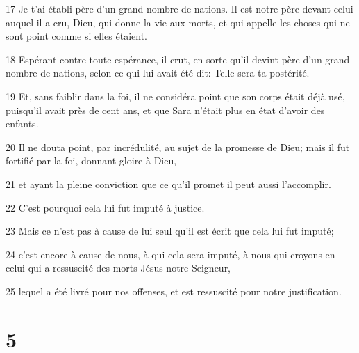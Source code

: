 \par 17 Je t'ai établi père d'un grand nombre de nations. Il est notre père devant celui auquel il a cru, Dieu, qui donne la vie aux morts, et qui appelle les choses qui ne sont point comme si elles étaient.
\par 18 Espérant contre toute espérance, il crut, en sorte qu'il devint père d'un grand nombre de nations, selon ce qui lui avait été dit: Telle sera ta postérité.
\par 19 Et, sans faiblir dans la foi, il ne considéra point que son corps était déjà usé, puisqu'il avait près de cent ans, et que Sara n'était plus en état d'avoir des enfants.
\par 20 Il ne douta point, par incrédulité, au sujet de la promesse de Dieu; mais il fut fortifié par la foi, donnant gloire à Dieu,
\par 21 et ayant la pleine conviction que ce qu'il promet il peut aussi l'accomplir.
\par 22 C'est pourquoi cela lui fut imputé à justice.
\par 23 Mais ce n'est pas à cause de lui seul qu'il est écrit que cela lui fut imputé;
\par 24 c'est encore à cause de nous, à qui cela sera imputé, à nous qui croyons en celui qui a ressuscité des morts Jésus notre Seigneur,
\par 25 lequel a été livré pour nos offenses, et est ressuscité pour notre justification.

\chapter{5}

